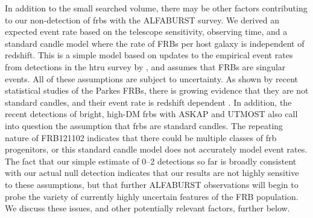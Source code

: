 \documentclass[a4paper,fleqn,usenatbib]{mnras}
\begin{document}
In addition to the small searched volume, there may be other factors
contributing to our non-detection of \glspl{frb} with the ALFABURST survey. We
derived an expected event rate based on the telescope sensitivity, observing
time, and a standard candle model \citep{2013MNRAS.436L...5L} where the rate of
FRBs per host galaxy is independent of redshift. This is a simple model based on
updates to the empirical event rates from detections in the \gls{htru} survey
\citep{2013Sci...341...53T} by \cite{2016MNRAS.460.3370C}, and assumes that FRBs
are singular events. All of these assumptions are subject to uncertainty. As
shown by recent statistical studies of the Parkes FRBs, there is growing
evidence that they are not  standard candles, and their event rate is redshift
dependent \citep{2016MNRAS.458..708C,ranethesis}.  In addition, the recent
detections of bright, high-DM \glspl{frb} with ASKAP \citep{2017ApJ...841L..12B}
and UTMOST \citep{2017MNRAS.468.3746C,atel10697} also call into question the
assumption that \glspl{frb} are  standard candles.  The repeating nature of
FRB121102 \citep{2016Natur.531..202S} indicates that there could be multiple
classes of \gls{frb} progenitors, or this standard candle model does not
accurately model event rates. The fact that our simple estimate of 0--2
detections so far is broadly consistent with our actual null detection indicates
that our results are not highly sensitive to these assumptions, but that further
ALFABURST observations will begin to probe the variety of currently highly
uncertain features of the FRB population. We discuss these issues, and other
potentially relevant factors, further below.
\end{document}
